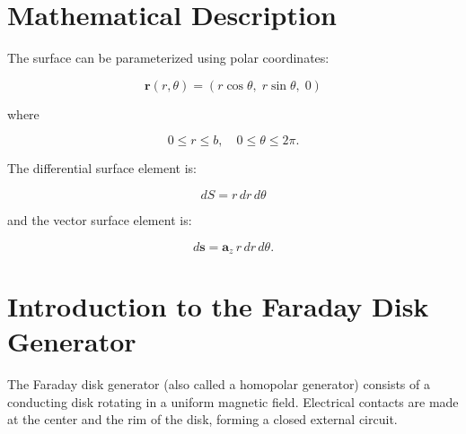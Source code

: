 \documentclass[12pt, a4paper]{article}
\begin{document}
\begin{center}
\end{center}

\section{Mathematical Description}

The surface can be parameterized using polar coordinates:

\[
\mathbf{r}(r,\theta) =
(r\cos\theta,\; r\sin\theta,\; 0)
\]

where

\[
0 \le r \le b, \quad 0 \le \theta \le 2\pi.
\]

The differential surface element is:

\[
dS = r\,dr\,d\theta
\]

and the vector surface element is:

\[
d\mathbf{s} = \mathbf{a}_z\, r\,dr\,d\theta.
\]

\section{Introduction to the Faraday Disk Generator}

The Faraday disk generator (also called a homopolar generator) consists of a 
conducting disk rotating in a uniform magnetic field. 
Electrical contacts are made at the center and the rim of the disk, forming 
a closed external circuit.
\end{document}
